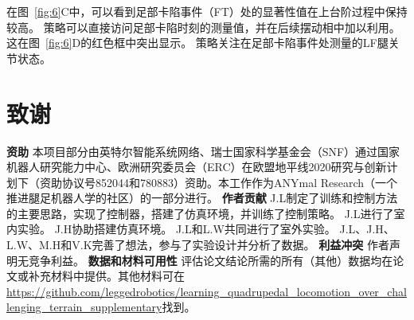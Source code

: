 \documentclass[9pt,twocolumn,twoside]{osajnl}
\begin{document}
在图~\ref{fig:6}C中，可以看到足部卡陷事件（FT）处的显著性值在上台阶过程中保持较高。
策略可以直接访问足部卡陷时刻的测量值，并在后续摆动相中加以利用。
这在图~\ref{fig:6}D的红色框中突出显示。
策略关注在足部卡陷事件处测量的LF腿关节状态。


\section{致谢}
\textbf{资助}
本项目部分由英特尔智能系统网络、瑞士国家科学基金会（SNF）通过国家机器人研究能力中心、欧洲研究委员会（ERC）在欧盟地平线2020研究与创新计划下（资助协议号852044和780883）资助。本工作作为ANYmal Research（一个推进腿足机器人学的社区）的一部分进行。
\textbf{作者贡献}
J.L制定了训练和控制方法的主要思路，实现了控制器，搭建了仿真环境，并训练了控制策略。
J.L进行了室内实验。
J.H协助搭建仿真环境。
J.L和L.W共同进行了室外实验。
J.L、J.H、L.W、M.H和V.K完善了想法，参与了实验设计并分析了数据。
\textbf{利益冲突} 作者声明无竞争利益。
\textbf{数据和材料可用性} 评估论文结论所需的所有（其他）数据均在论文或补充材料中提供。其他材料可在\href{https://github.com/leggedrobotics/learning_quadrupedal_locomotion_over_challenging_terrain_supplementary}{\url{https://github.com/leggedrobotics/learning_quadrupedal_locomotion_over_challenging_terrain_supplementary}}找到。
\end{document}
